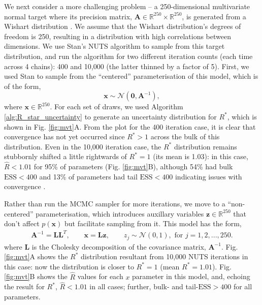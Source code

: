 \documentclass{article}
\begin{document}
We next consider a more challenging problem -- a 250-dimensional multivariate normal target where its precision matrix, $\boldsymbol{A}\in\mathbb{R}^{250}\times\mathbb{R}^{250}$, is generated from a Wishart distribution \citep{hoffman2014no}. We assume that the Wishart distribution's degrees of freedom is 250, resulting in a distribution with high correlations between dimensions. We use Stan's NUTS algorithm to sample from this target distribution, and run the algorithm for two different iteration counts (each time across 4 chains): 400 and 10,000 (the latter thinned by a factor of 5). First, we used Stan to sample from the ``centered'' parameterisation of this model, which is of the form,
%
\begin{equation}\label{eq:mvt_normal_250}
\boldsymbol{x}\sim \mathcal{N}(\boldsymbol{0},\boldsymbol{A}^{-1}),
\end{equation}
%
where $\boldsymbol{x}\in\mathbb{R}^{250}$. For each set of draws, we used Algorithm \ref{alg:R_star_uncertainty} to generate an uncertainty distribution for $R^*$, which is shown in Fig. \ref{fig:mvt}A. From the plot for the 400 iteration case, it is clear that convergence has not yet occurred since $R^*>1$ across the bulk of this distribution. Even in the 10,000 iteration case, the $R^*$ distribution remains stubbornly shifted a little rightwards of $R^*=1$ (its mean is 1.03): in this case, $\widehat{R}<1.01$ for 95\% of parameters (Fig. \ref{fig:mvt}B), although 54\% had bulk $\text{ESS}<400$ and 13\% of parameters had tail $\text{ESS}<400$ indicating issues with convergence \citep{vehtari2019rank}.

Rather than run the MCMC sampler for more iterations, we move to a ``non-centered'' parameterisation, which introduces auxillary variables $\boldsymbol{z}\in\mathbb{R}^{250}$ that don't affect $p(\boldsymbol{x})$ but facilitate sampling from it. This model has the form,
%
\begin{align}
\boldsymbol{A}^{-1} = \boldsymbol{L}\boldsymbol{L}^T,\qquad
\boldsymbol{x} = \boldsymbol{L} \boldsymbol{z},\qquad
z_j\sim \mathcal{N}(0, 1), \text{ for } j = 1,2,...,250.
\end{align}
%
where $\boldsymbol{L}$ is the Cholesky decomposition of the covariance matrix, $\boldsymbol{A}^{-1}$. Fig. \ref{fig:mvt}A shows the $R^*$ distribution resultant from 10,000 NUTS iterations in this case: now the distribution is closer to $R^*=1$ (mean $R^*=1.01$). Fig. \ref{fig:mvt}B shows the $\widehat{R}$ values for each $x$ parameter in this model, and, echoing the result for $R^*$, $\widehat{R}<1.01$ in all cases; further, bulk- and tail-$\text{ESS}>400$ for all parameters.
\end{document}
